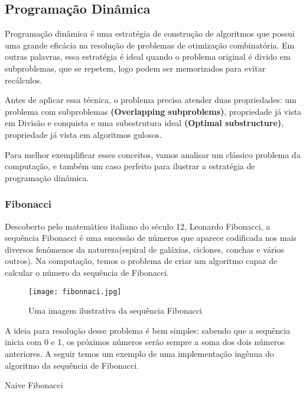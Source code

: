 
  \subsection{Programação Dinâmica}

    Programação dinâmica é uma estratégia de construção de algoritmos que 
    possui uma grande eficácia na resolução de problemas de otimização combinatória.
    Em outras palavras, essa estratégia é ideal quando o problema original 
    é divido em subproblemas, que se repetem, logo podem ser memorizados para 
    evitar recálculos.

    Antes de aplicar essa técnica, o problema precisa atender duas propriedades:
    um problema com subproblemas \textbf{(Overlapping subproblems)}, propriedade já vista 
    em Divisão e conquista e uma subestrutura ideal \textbf{(Optimal substructure)}, propriedade 
    já vista em algoritmos gulosos.

    Para melhor exemplificar esses conceitos, vamos analisar um clássico problema da computação, 
    e também um caso perfeito para ilustrar a estratégia de programação dinâmica.

    \subsubsection{Fibonacci}

    Descoberto pelo matemático italiano do século 12, Leonardo Fibonacci, a sequência 
    Fibonacci é uma sucessão de números que aparece codificada nos mais diversos fenômenos 
    da natureza(espiral de galáxias, ciclones, conchas e vários outros). Na computação, temos 
    o problema de criar um algoritmo capaz de calcular o número da sequência de Fibonacci.

    \begin{figure}[ht]
      \centering
      \texttt{[image: fibonnaci.jpg]}
      \caption{Uma imagem ilustrativa da sequência Fibonacci}
      \label{fig:fibonnaci}
    \end{figure}

    A ideia para resolução desse problema é bem simples: sabendo que a sequência inicia com 0 e 1, os
    próximos números serão sempre a soma dos dois números anteriores. A seguir temos um exemplo 
    de uma implementação ingênua do algoritmo da sequência de Fibonacci.

    \begin{algorithm}
      \caption{Naive Fibonacci} 
      \begin{algorithmic}[1]
      \EndIf
      \EndProcedure
      \end{algorithmic}
    \end{algorithm}

